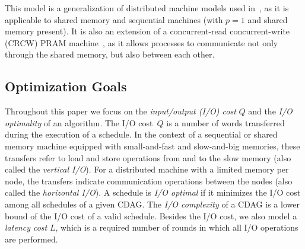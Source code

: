 \documentclass[sigplan,review,anonymous,10pt]{acmart}\settopmatter{printfolios=true,printccs=false,printacmref=false}
\newcommand\greg[1]{\textcolor{blue}{[Greg: #1]}}
\newcommand\mac[1]{\textcolor{red}{[Mac: #1]}}
\begin{document}
This model is a generalization of distributed machine models used 
in~\cite{CARMA,25d}, as it is applicable to shared memory and sequential 
machines (with $p=1$ and shared memory present). It is also an extension of a 
concurrent-read concurrent-write (CRCW) PRAM machine~\cite{pram}, as it allows 
processes to communicate not only through the shared memory, but also between 
each other.

%


\subsection{Optimization Goals}
\label{sec:optGoals}
%
Throughout this paper we focus on the \emph{input/output (I/O) cost} $Q$ and 
the \emph{I/O optimality} of an algorithm.
%
The 
I/O cost~$Q$ is a number of words transferred during the execution 
of a schedule. In the context of a sequential or shared memory machine equipped 
with small-and-fast and slow-and-big memories, these transfers refer to load 
and store operations from and to the slow memory (also called the 
\emph{vertical 
	I/O}). For a distributed machine with a limited memory per node, 
the 
transfers indicate communication operations between the nodes (also called the
\emph{horizontal I/O}). A schedule is \emph{I/O optimal} if it minimizes the 
I/O cost among all schedules of a given CDAG. 
The 
\emph{I/O complexity} of a 
CDAG is a lower bound of the I/O cost of a valid schedule.
%
Besides the I/O cost, we also model a \emph{latency cost} $L$, which is 
a required number of rounds in 
which all I/O operations are performed.

\end{document}
